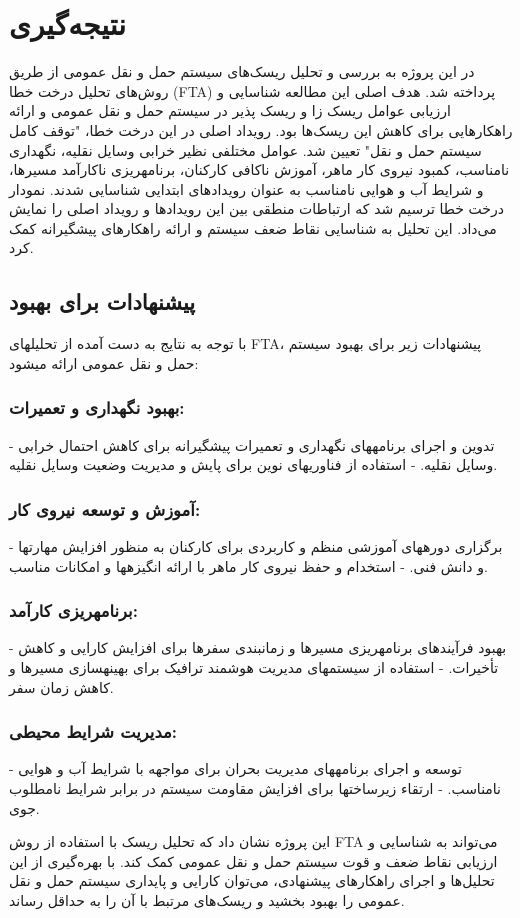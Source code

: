 \chapter{نتیجه‌گیری}
در این پروژه به بررسی و تحلیل ریسک‌های سیستم حمل و نقل عمومی از طریق روش‌های تحلیل درخت خطا (FTA) پرداخته شد. هدف اصلی این مطالعه شناسایی و ارزیابی عوامل ریسک زا و ریسک پذیر در سیستم حمل و نقل عمومی و ارائه راهکارهایی برای کاهش این ریسک‌ها بود. 
رویداد اصلی در این درخت خطا، "توقف کامل سیستم حمل و نقل" تعیین شد. عوامل مختلفی نظیر خرابی وسایل نقلیه، نگهداری نامناسب، کمبود نیروی کار ماهر، آموزش ناکافی کارکنان، برنامهریزی ناکارآمد مسیرها، و شرایط آب و هوایی نامناسب به عنوان رویدادهای ابتدایی شناسایی شدند. نمودار درخت خطا ترسیم شد که ارتباطات منطقی بین این رویدادها و رویداد اصلی را نمایش می‌داد. این تحلیل به شناسایی نقاط ضعف سیستم و ارائه راهکارهای پیشگیرانه کمک کرد.

\section{پیشنهادات برای بهبود}

با توجه به نتایج به دست آمده از تحلیلهای FTA، پیشنهادات زیر برای بهبود سیستم حمل و نقل عمومی ارائه میشود:

\subsection{بهبود نگهداری و تعمیرات:}
- تدوین و اجرای برنامههای نگهداری و تعمیرات پیشگیرانه برای کاهش احتمال خرابی وسایل نقلیه.
- استفاده از فناوریهای نوین برای پایش و مدیریت وضعیت وسایل نقلیه.

\subsection{آموزش و توسعه نیروی کار:}
- برگزاری دورههای آموزشی منظم و کاربردی برای کارکنان به منظور افزایش مهارتها و دانش فنی.
- استخدام و حفظ نیروی کار ماهر با ارائه انگیزهها و امکانات مناسب.

\subsection{برنامهریزی کارآمد:}
- بهبود فرآیندهای برنامهریزی مسیرها و زمانبندی سفرها برای افزایش کارایی و کاهش تأخیرات.
- استفاده از سیستمهای مدیریت هوشمند ترافیک برای بهینهسازی مسیرها و کاهش زمان سفر.

\subsection{مدیریت شرایط محیطی:}
- توسعه و اجرای برنامههای مدیریت بحران برای مواجهه با شرایط آب و هوایی نامناسب.
- ارتقاء زیرساختها برای افزایش مقاومت سیستم در برابر شرایط نامطلوب جوی.


این پروژه نشان داد که تحلیل ریسک با استفاده از روش FTA می‌تواند به شناسایی و ارزیابی نقاط ضعف و قوت سیستم حمل و نقل عمومی کمک کند. با بهره‌گیری از این تحلیل‌ها و اجرای راهکارهای پیشنهادی، می‌توان کارایی و پایداری سیستم حمل و نقل عمومی را بهبود بخشید و ریسک‌های مرتبط با آن را به حداقل رساند.